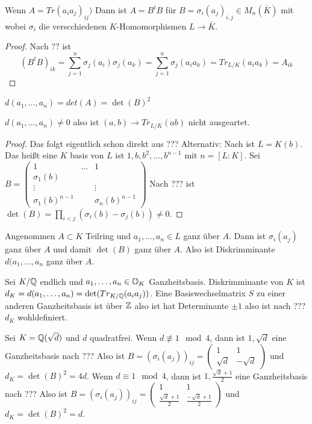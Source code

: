 \begin{Lemma}
    Wenn \(A=Tr(a_ia_j)_{ij})\) Dann ist \(A=B^tB\) für \(B=\sigma_i(a_j)_{i,j}\in M_n(\bar K)\) mit
    wobei \(\sigma_i\) die verscchiedenen \(K\)-Homomorphismen \(L\to \bar K\).
\end{Lemma}
\begin{proof}
    Nach ?? ist
    \[(B^tB)_{ik}=\sum_{j=1}^n\sigma_j(a_i)\sigma_j(a_k)=\sum_{j=1}^n\sigma_j(a_ia_k)=Tr_{L/K}(a_ia_k)=A_{ik}\]
\end{proof}
\begin{Kor}
    \(d(a_1,\dots,a_n)=det(A)=\det(B)^2\)
\end{Kor}
\begin{Satz}
\(d(a_1,\dots,a_n)\neq 0\) also ist \((a,b)\to Tr_{L/K}(ab)\) nicht ausgeartet.
\end{Satz}
\begin{proof}
    Das folgt eigentlich schon direkt aus ???
    Alternativ:
    Nach  ist \(L=K(b)\).
    Das heißt eine \(K\) basis von \(L\) ist \(1,b,b^2,\dots,b^{n-1}\) mit \(n=[L:K]\).
    Sei \(B=\begin{pmatrix}
1 & \dots & 1 \\
\sigma_1(b) &  &  \\
\vdots &  & \vdots \\
\sigma_1(b)^{n-1} &  & \sigma_n(b)^{n-1} 
\end{pmatrix} \) 
Nach ??? ist \(\det(B)=\prod_{i<j}(\sigma_i(b)-\sigma_j(b))\neq 0\).
\end{proof}
\begin{Bem}
    Angenommen \(A\subset K\) Teilring und \(a_1,\dots,a_n\in L\) ganz über \(A\).
    Dann ist \(\sigma_i(a_j)\) ganz über \(A\) und damit \(\det(B)\) ganz über \(A\).
    Also ist Diskrimminante \(d(a_1,\dots,a_n\) ganz über \(A\).
\end{Bem}
\begin{Def}
    Sei \(K/\mathbb{Q}\) endlich und \(a_1,\dots,a_n\in\mathbb{O}_K\) Ganzheitsbasis.
    Diskrimminante von \(K\) ist 
    \(d_K=d(a_1,\dots,a_n)=\det(Tr_{K/\mathbb{Q}}(a_ia_j))\).
    Eine Basiswechselmatrix \(S\) zu einer anderen Ganzheitsbasis ist über \(\mathbb{Z}\) 
    also ist hat Determinante \(\pm 1\) also ist nach ??? \(d_K\) wohldefiniert.
\end{Def}
\begin{Bsp}
    Sei \(K=\mathbb{Q}(\sqrt{d})\) und \(d\) quadratfrei.
    Wenn \(d\not\equiv 1 \mod 4\), dann ist \(1,\sqrt{d}\) eine Ganzheitsbasis nach ???
    Also ist \(B=(\sigma_i(a_j))_{ij}=\begin{pmatrix}
        1 & 1 \\
        \sqrt{d} & -\sqrt{d}
    \end{pmatrix}\) 
    und \(d_K=\det(B)^2=4d\).
    Wenn \(d\equiv 1 \mod 4\), dann ist \(1,\frac{\sqrt{d}+1}{2}\) eine Ganzheitsbasis nach ???
    Also ist \(B=(\sigma_i(a_j))_{ij}=\begin{pmatrix}
        1 & 1 \\
        \frac{\sqrt{d}+1}{2} & \frac{-\sqrt{d}+1}{2}
    \end{pmatrix}\) 
    und \(d_K=\det(B)^2=d\).
    
\end{Bsp}
